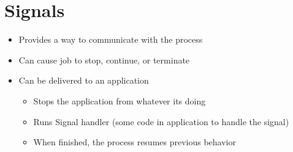 \documentclass[12pt]{article}
\begin{document}
\section{Signals}

\begin{itemize}
    \item Provides a way to communicate with the process
    \item Can cause job to stop, continue, or terminate
    \item Can be delivered to an application

    \begin{itemize}
        \item Stops the application from whatever its doing
        \item Runs Signal handler (some code in application to handle the signal)
        \item When finished, the process resumes previous behavior
    \end{itemize}
\end{itemize}
\end{document}
